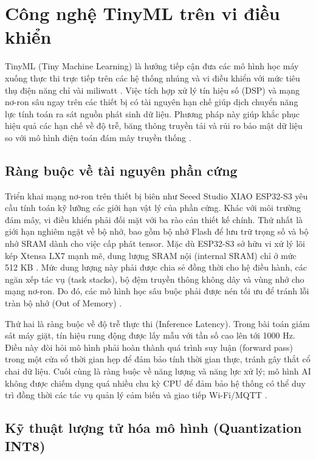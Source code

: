 \section{Công nghệ TinyML trên vi điều khiển}

TinyML (Tiny Machine Learning) là hướng tiếp cận đưa các mô hình học máy xuống thực thi trực tiếp trên các hệ thống nhúng và vi điều khiển với mức tiêu thụ điện năng chỉ vài miliwatt \cite{ref_1_1}. Việc tích hợp xử lý tín hiệu số (DSP) và mạng nơ-ron sâu ngay trên các thiết bị có tài nguyên hạn chế giúp dịch chuyển năng lực tính toán ra sát nguồn phát sinh dữ liệu. Phương pháp này giúp khắc phục hiệu quả các hạn chế về độ trễ, băng thông truyền tải và rủi ro bảo mật dữ liệu so với mô hình điện toán đám mây truyền thống \cite{ref_1_4}.

\subsection{Ràng buộc về tài nguyên phần cứng}

Triển khai mạng nơ-ron trên thiết bị biên như Seeed Studio XIAO ESP32-S3 yêu cầu tính toán kỹ lưỡng các giới hạn vật lý của phần cứng. Khác với môi trường đám mây, vi điều khiển phải đối mặt với ba rào cản thiết kế chính. Thứ nhất là giới hạn nghiêm ngặt về bộ nhớ, bao gồm bộ nhớ Flash để lưu trữ trọng số và bộ nhớ SRAM dành cho việc cấp phát tensor. Mặc dù ESP32-S3 sở hữu vi xử lý lõi kép Xtensa LX7 mạnh mẽ, dung lượng SRAM nội (internal SRAM) chỉ ở mức 512 KB \cite{ref_1_15}. Mức dung lượng này phải được chia sẻ đồng thời cho hệ điều hành, các ngăn xếp tác vụ (task stacks), bộ đệm truyền thông không dây và vùng nhớ cho mạng nơ-ron. Do đó, các mô hình học sâu buộc phải được nén tối ưu để tránh lỗi tràn bộ nhớ (Out of Memory) \cite{ref_1_11}.

Thứ hai là ràng buộc về độ trễ thực thi (Inference Latency). Trong bài toán giám sát máy giặt, tín hiệu rung động được lấy mẫu với tần số cao lên tới 1000 Hz. Điều này đòi hỏi mô hình phải hoàn thành quá trình suy luận (forward pass) trong một cửa sổ thời gian hẹp để đảm bảo tính thời gian thực, tránh gây thắt cổ chai dữ liệu. Cuối cùng là ràng buộc về năng lượng và năng lực xử lý; mô hình AI không được chiếm dụng quá nhiều chu kỳ CPU để đảm bảo hệ thống có thể duy trì đồng thời các tác vụ quản lý cảm biến và giao tiếp Wi-Fi/MQTT \cite{ref_1_1}.

\subsection{Kỹ thuật lượng tử hóa mô hình (Quantization INT8)}

